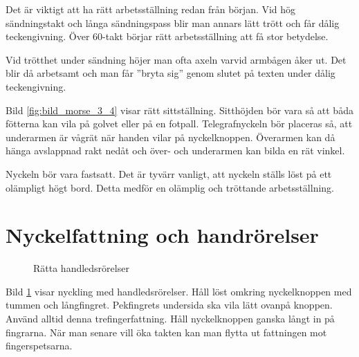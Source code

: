 Det är viktigt att ha rätt arbetsställning redan från början.
Vid hög sändningstakt och långa sändningspass blir man annars lätt trött och
får dålig teckengivning.
Över 60-takt börjar rätt arbetsställning att få stor betydelse.

Vid trötthet under sändning höjer man ofta axeln varvid armbågen åker ut.
Det blir då arbetsamt och man får ''bryta sig'' genom slutet på texten under
dålig teckengivning.

Bild \ref{fig:bild_morse_3_4} visar rätt sittställning.
Sitthöjden bör vara så att båda fötterna kan vila på golvet eller på en fotpall.
Telegrafnyckeln bör placeras så, att underarmen är vågrät när handen vilar på
nyckelknoppen.
Överarmen kan då hänga avslappnad rakt nedåt och över- och underarmen kan bilda
en rät vinkel.

Nyckeln bör vara fastsatt. Det är tyvärr vanligt, att nyckeln ställs löst på ett
olämpligt högt bord. Detta medför en olämplig och tröttande arbetsställning.

\section[Fattning]{Nyckelfattning och handrörelser}

\begin{figure}
  \caption{Rätta handledsrörelser}
  \label{fig:bild_morse_5}
\end{figure}

Bild \ref{fig:bild_morse_5} visar nyckling med handledsrörelser.
Håll löst omkring nyckelknoppen med tummen och långfingret.
Pekfingrets undersida ska vila lätt ovanpå knoppen.
Använd alltid denna trefingerfattning.
Håll nyckelknoppen ganska långt in på fingrarna.
När man senare vill öka takten kan man flytta ut fattningen mot fingerspetsarna.

